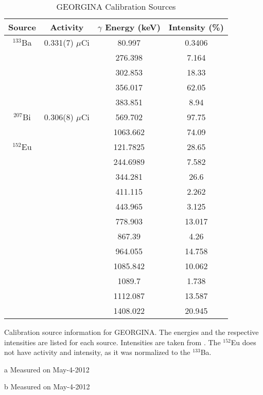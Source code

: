 \begin{table}[]
    \centering
    \small
    \caption{GEORGINA Calibration Sources}
        \label{tab:GEORGINA_Cal_Source}
    \begin{threeparttable}
    \begin{tabular}{c|c|c|c} \toprule
         Source & Activity & $\gamma$ Energy (keV) & Intensity (\%)\\
          \hline 
         $^{133}$Ba & 0.331(7) $\mu$Ci\tnote{a} & 80.997 & 0.3406 \\
         & & 276.398 & 7.164 \\
         & & 302.853 & 18.33 \\
         & & 356.017 & 62.05 \\
         & & 383.851 & 8.94 \\
         \hline
         $^{207}$Bi & 0.306(8) $\mu$Ci\tnote{b} & 569.702 & 97.75 \\ 
         & & 1063.662 & 74.09 \\
         \hline
         $^{152}$Eu & & 121.7825 & 28.65 \\
         & & 244.6989 & 7.582 \\
         & & 344.281 & 26.6 \\
         & & 411.115 & 2.262 \\
         & & 443.965 & 3.125 \\
         & & 778.903 & 13.017 \\
         & & 867.39 & 4.26 \\
         & & 964.055 & 14.758 \\
         & & 1085.842 & 10.062 \\
         & & 1089.7 & 1.738 \\
         & & 1112.087 & 13.587 \\
         & & 1408.022 & 20.945 \\\bottomrule
    \end{tabular}
    \begin{tablenotes}[para]
    Calibration source information for GEORGINA. The energies and the respective intensities are listed for each source. Intensities are taken from \cite{trzaska90:_calibration}. The  $^{152}$Eu does not have activity and intensity, as it was normalized to the $^{133}$Ba.
    \newline\item[a] Measured on May-4-2012
    \newline\item[b] Measured on May-4-2012
    \end{tablenotes}
    \end{threeparttable}    
\end{table}
